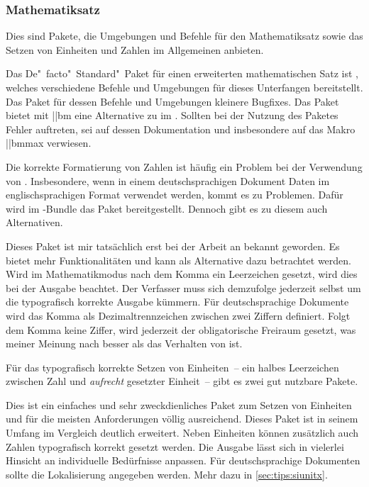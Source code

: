 \subsubsection{Mathematiksatz}
%
Dies sind Pakete, die Umgebungen und Befehle für den Mathematiksatz sowie das 
Setzen von Einheiten und Zahlen im Allgemeinen anbieten.

\begin{DeclarePackages}
  Das De"~facto"~Standard"~Paket für einen erweiterten mathematischen Satz ist 
  , welches verschiedene Befehle und Umgebungen für dieses 
  Unterfangen bereitstellt. Das Paket  für dessen Befehle 
  und Umgebungen kleinere Bugfixes.
  Das Paket bietet mit \Macro||{bm} eine Alternative zu  im 
  . Sollten bei
  der Nutzung des Paketes Fehler auftreten, sei auf dessen Dokumentation und 
  insbesondere auf das Makro \Macro||{bmmax} verwiesen.
\end{DeclarePackages}
%
Die korrekte Formatierung von Zahlen ist häufig ein Problem bei der Verwendung 
von . Insbesondere, wenn in einem deutschsprachigen Dokument 
Daten im englischsprachigen Format verwendet werden, kommt es zu Problemen. 
Dafür wird im \TUDScript-Bundle das Paket  bereitgestellt. 
Dennoch gibt es zu diesem auch Alternativen.
%
\begin{DeclarePackages}
%
  Dieses Paket ist mir tatsächlich erst bei der Arbeit an  
  bekannt geworden. Es bietet mehr Funktionalitäten und kann als Alternative 
  dazu betrachtet werden.
  Wird im Mathematikmodus nach dem Komma ein Leerzeichen gesetzt, wird dies 
  bei der Ausgabe beachtet. Der Verfasser muss sich demzufolge jederzeit 
  selbst um die typografisch korrekte Ausgabe kümmern.
  Für deutschsprachige Dokumente wird das Komma als Dezimaltrennzeichen 
  zwischen zwei Ziffern definiert. Folgt dem Komma keine Ziffer, wird 
  jederzeit der obligatorische Freiraum gesetzt, was meiner Meinung nach 
  besser als das Verhalten von  ist.
%
\end{DeclarePackages}
%
Für das typografisch korrekte Setzen von Einheiten~-- ein halbes Leerzeichen 
zwischen Zahl und \emph{aufrecht} gesetzter Einheit~-- gibt es zwei gut 
nutzbare Pakete.
%
\begin{DeclarePackages}
%
  Dies ist ein einfaches und sehr zweckdienliches Paket zum Setzen von 
  Einheiten und für die meisten Anforderungen völlig ausreichend.
  Dieses Paket ist in seinem Umfang im Vergleich deutlich erweitert. Neben 
  Einheiten können zusätzlich auch Zahlen typografisch korrekt gesetzt werden. 
  Die Ausgabe lässt sich in vielerlei Hinsicht an individuelle Bedürfnisse 
  anpassen. Für deutschsprachige Dokumenten sollte die Lokalisierung angegeben 
  werden. Mehr dazu in \autoref{sec:tips:siunitx}.
%
\end{DeclarePackages}
